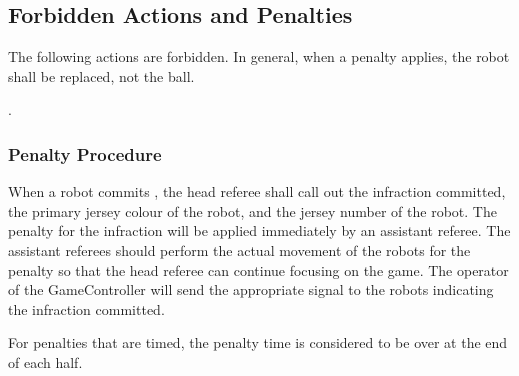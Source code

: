 \subsection{Forbidden Actions and Penalties}
\label{sec:forbidden_act}

The following actions are forbidden. In general, when a penalty applies, the robot shall be replaced, not the ball.


.

\subsubsection{Penalty Procedure}
\label{sec:penalty_procedure}

When a robot commits , the head referee shall call out the infraction committed, the primary jersey colour of the robot, and the jersey number of the robot. The penalty for the infraction will be applied immediately by an assistant referee. The assistant referees should perform the actual movement of the robots for the penalty so that the head referee can continue focusing on the game. The operator of the GameController will send the appropriate signal to the robots indicating the infraction committed.

For penalties that are timed, the penalty time is considered to be over at the end of each half.

